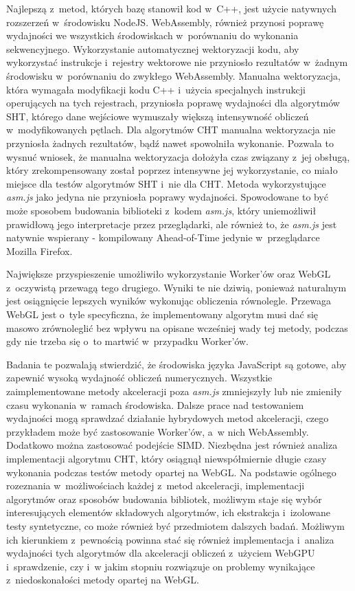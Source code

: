Najlepszą z~metod, których bazę stanowił kod w~C++, jest użycie natywnych rozszerzeń w~środowisku NodeJS. WebAssembly, również przynosi poprawę wydajności we wszystkich środowiskach w~porównaniu do wykonania sekwencyjnego. Wykorzystanie automatycznej wektoryzacji kodu, aby wykorzystać instrukcje i~rejestry wektorowe nie przyniosło rezultatów w~żadnym środowisku w~porównaniu do zwykłego WebAssembly. Manualna wektoryzacja, która wymagała modyfikacji kodu C++ i~użycia specjalnych instrukcji operujących na tych rejestrach, przyniosła poprawę wydajności dla algorytmów SHT, którego dane wejściowe wymuszały większą intensywność obliczeń w~modyfikowanych pętlach. Dla algorytmów CHT manualna wektoryzacja nie przyniosła żadnych rezultatów, bądź nawet spowolniła wykonanie. Pozwala to wysnuć wniosek, że manualna wektoryzacja dołożyła czas związany z~jej obsługą, który zrekompensowany został poprzez intensywne jej wykorzystanie, co miało miejsce dla testów algorytmów SHT i~nie dla CHT. Metoda wykorzystujące \textit{asm.js} jako jedyna nie przyniosła poprawy wydajności. Spowodowane to być może sposobem budowania biblioteki z~kodem \textit{asm.js}, który uniemożliwił prawidłową jego interpretacje przez przeglądarki, ale również to, że \textit{asm.js} jest natywnie wspierany - kompilowany Ahead-of-Time jedynie w~przeglądarce Mozilla Firefox.

Największe przyspieszenie umożliwiło wykorzystanie Worker'ów oraz WebGL z~oczywistą przewagą tego drugiego. Wyniki te nie dziwią, ponieważ naturalnym jest osiągnięcie lepszych wyników wykonując obliczenia równolegle. Przewaga WebGL jest o~tyle specyficzna, że implementowany algorytm musi dać się masowo zrównoleglić bez wpływu na opisane wcześniej wady tej metody, podczas gdy nie trzeba się o~to martwić w~przypadku Worker'ów. 

Badania te pozwalają stwierdzić, że środowiska języka JavaScript są gotowe, aby zapewnić wysoką wydajność obliczeń numerycznych. Wszystkie zaimplementowane metody akceleracji poza \textit{asm.js} zmniejszyły lub nie zmieniły czasu wykonania w~ramach środowiska. Dalsze prace nad testowaniem wydajności mogą sprawdzać działanie hybrydowych metod akceleracji, czego przykładem może być zastosowanie Worker'ów, a~w nich WebAssembly. Dodatkowo można zastosować podejście SIMD. Niezbędna jest również analiza implementacji algorytmu CHT, który osiągnął niewspółmiernie długie czasy wykonania podczas testów metody opartej na WebGL. Na podstawie ogólnego rozeznania w~możliwościach każdej z~metod akceleracji, implementacji algorytmów oraz sposobów budowania bibliotek, możliwym staje się wybór interesujących elementów składowych algorytmów, ich ekstrakcja i~izolowane testy syntetyczne, co może również być przedmiotem dalszych badań. Możliwym ich kierunkiem z~pewnością powinna stać się również implementacja i~analiza wydajności tych algorytmów dla akceleracji obliczeń z~użyciem WebGPU i~sprawdzenie, czy i~w jakim stopniu rozwiązuje on problemy wynikające z~niedoskonałości metody opartej na WebGL.

